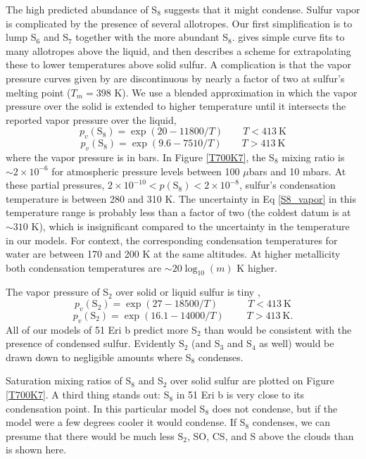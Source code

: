 \documentclass[preprint]{aastex}
\begin{document}
The high predicted abundance of S$_8$ suggests that it might condense.
Sulfur vapor is complicated by the presence of several allotropes. %
Our first simplification is to lump S$_6$ and S$_7$ together with the more abundant S$_8$. 
\citet{Lyons2008} gives simple curve fits to many allotropes above the liquid, and then describes a scheme for 
extrapolating these to lower temperatures above solid sulfur.
A complication is that the vapor pressure curves given by \citet{Lyons2008} are discontinuous by
 nearly a factor of two at sulfur's melting point ($T_m=398$ K).
We use a blended approximation in which the vapor pressure over the solid is extended
to higher temperature until it intersects the reported vapor pressure over the liquid,
 \[
 p_v(\mathrm{S}_8) = \exp{\left(20 -11800/T\right)} \qquad  T < 413 \mathrm{~K}
 \]
\begin{equation}
\label{S8_vapor}
 p_v(\mathrm{S}_8) = \exp{\left(9.6 -7510/T\right)} \qquad T > 413 \mathrm{~K}
\end{equation}
where the vapor pressure is in bars.  
In Figure \ref{T700K7}, the S$_8$ mixing ratio is $\sim 2\times 10^{-6}$ for atmospheric pressure levels between 100 $\mu$bars and 10 mbars.
At these partial pressures, $2\times 10^{-10} < p(\mathrm{S}_8) < 2\times 10^{-8}$, sulfur's condensation temperature is between 280 and 310 K.
The uncertainty in Eq \ref{S8_vapor} in this temperature range is probably less than a factor of two (the coldest datum is at $\sim 310$ K),
which is insignificant compared to the uncertainty in the temperature in our models.
For context, the corresponding condensation temperatures for water are between 170 and 200 K at the same altitudes.
At higher metallicity both condensation temperatures are $\sim 20\log_{10}(m)$ K higher. 

The vapor pressure of S$_2$ over solid or liquid sulfur is tiny \citep{Lyons2008}, 
\[
 p_v(\mathrm{S}_2) = \exp{\left(27 -18500/T\right)} \quad\qquad  T < 413 \mathrm{~K}
\]
\begin{equation}
\label{S2_vapor}
 p_v(\mathrm{S}_2) = \exp{\left(16.1 -14000/T\right)} \;\qquad T > 413 \mathrm{~K} .
\end{equation}
All of our models of 51 Eri b predict more S$_2$ than would be consistent
with the presence of condensed sulfur.  Evidently
S$_2$ (and S$_3$ and S$_4$ as well) would be drawn down to negligible amounts where S$_8$ condenses.

Saturation mixing ratios of S$_8$ and S$_2$ over solid sulfur are plotted on Figure \ref{T700K7}. 
A third thing stands out: S$_8$ in 51 Eri b is very close to its condensation point.
In this particular model S$_8$ does not condense, but if the model were a few degrees cooler
it would condense.
If S$_8$ condenses, we can presume that there would be much less S$_2$, SO, CS, and S above the clouds
than is shown here.   
\end{document}
